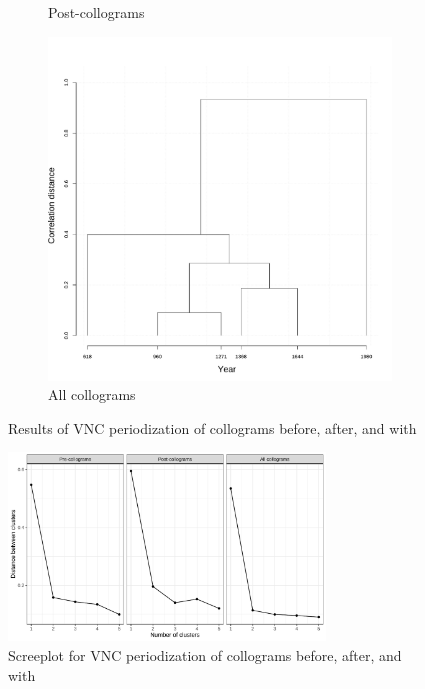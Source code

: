 \begin{figure}[H]
\begin{subfigure}{0.3\textwidth}
    \caption{Post-collograms}
  \end{subfigure}
  \quad
  \begin{subfigure}{0.3\textwidth}
    \includegraphics[width=\linewidth]{figures_new/VNC_lanbox/all_collocate_df_VNC_cor.pdf}
    \caption{All collograms}
  \end{subfigure}
  \caption{Results of VNC periodization of collograms before, after, and with \jia} \label{fig:collogram_VNC}
\end{figure}

\begin{figure}[H]
  \centering
  \includegraphics[width=0.75\textwidth,keepaspectratio]{figures_new/VNC_lanbox/screeplot_collocate.pdf}
  \caption{Screeplot for VNC periodization of collograms before, after, and with \jia} \label{fig:collogram_screeplot}
\end{figure}

